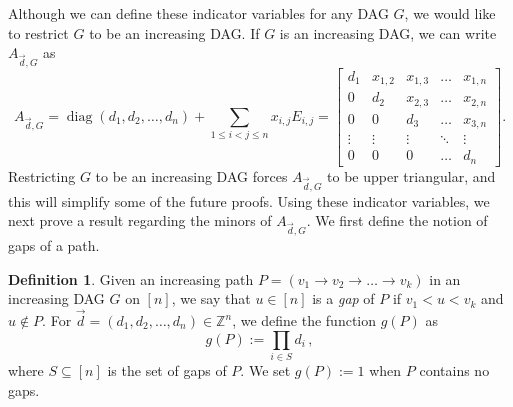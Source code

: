 \documentclass[12pt]{amsart}
\theoremstyle{definition}
\newtheorem{defn}[thm]{Definition}
\numberwithin{equation}{section}
\newcommand{\ring}[1]{\ensuremath{\mathbb{#1}}}
\renewcommand\>{\rangle}
\newcommand\<{\langle}
\newcommand\0{\mathbf{0}}
\newcommand\ZZ{\ring{Z}}
\DeclareMathOperator{\diag}{diag}
\begin{document}
Although we can define these indicator variables for any DAG $G$, we would like to restrict $G$ to be an increasing DAG. If $G$ is an increasing DAG, we can write $A_{\vec{d}, G}$ as
\[A_{\vec{d}, G} = \diag(d_1,d_2,\dots, d_n) + \sum_{1 \leq i < j \leq n} x_{i,j}E_{i,j} = \begin{bmatrix} 
	d_1 & x_{1,2} & x_{1,3} & \dots & x_{1,n}\\
	0 & d_2 & x_{2,3} & \dots & x_{2,n}\\
	0 & 0 & d_3 & \dots & x_{3,n}\\
	\vdots & \vdots & \vdots & \ddots & \vdots\\
	0 & 0 & 0 & \dots & d_n	
\end{bmatrix}.\]
Restricting $G$ to be an increasing DAG forces $A_{\vec{d}, G}$ to be upper triangular, and this will simplify some of the future proofs. 
Using these indicator variables, we next prove a result regarding the minors of $A_{\vec{d}, G}$. 
We first define the notion of gaps of a path.
\begin{defn}
	Given an increasing path $P = (v_1\to v_2 \to \dots \to v_k)$ in an increasing DAG $G$ on $[n]$, we say that $u \in [n]$ is a \emph{gap} of $P$ if $v_1 < u < v_k$ and $u\notin P$.
	For $\vec{d} = (d_1,d_2,\dots, d_n) \in \ZZ^n$, we define the function $g(P)$ as 
	\[
	g(P) := \prod_{i \in S} d_i \, ,
	\]
	where $S \subseteq [n]$ is the set of gaps of $P$. 
	We set $g(P) := 1$ when $P$ contains no gaps.
\end{defn}
\end{document}
